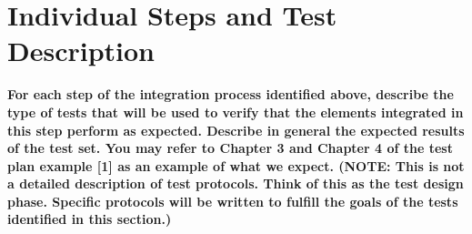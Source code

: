 \chapter{Individual Steps and Test Description}\label{chap:steps}

\textbf{For each step of the integration process identified above, describe the type of tests that will be used to verify that the elements integrated in this step perform as expected. Describe in general the expected results of the test set. You may refer to Chapter 3 and Chapter 4 of the test plan example [1] as an example of what we expect.
(NOTE: This is not a detailed description of test protocols. Think of this as the test design phase. Specific protocols will be written to fulfill the goals of the tests identified in this section.)}